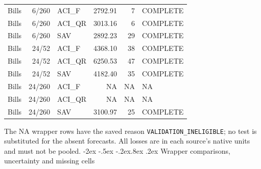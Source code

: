 \documentclass[10pt,a4paper]{article}
\makeatletter
\renewcommand\section{\@startsection{section}{1}{\z@}%
  {-2ex \@plus -.5ex \@minus -.2ex}{.8ex \@plus .2ex}%
  {\normalfont\large\bfseries}}
\makeatother
\begin{document}
\begin{longtable}{lrlrrl}
Bills & 6/260 & ACI\_F & 2792.91 & 7 & COMPLETE \\
Bills & 6/260 & ACI\_QR & 3013.16 & 6 & COMPLETE \\
Bills & 6/260 & SAV & 2892.23 & 29 & COMPLETE \\
Bills & 24/52 & ACI\_F & 4368.10 & 38 & COMPLETE \\
Bills & 24/52 & ACI\_QR & 6250.53 & 47 & COMPLETE \\
Bills & 24/52 & SAV & 4182.40 & 35 & COMPLETE \\
Bills & 24/260 & ACI\_F & NA & NA & NA \\
Bills & 24/260 & ACI\_QR & NA & NA & NA \\
Bills & 24/260 & SAV & 3100.97 & 25 & COMPLETE \\
\end{longtable}
\endgroup

The NA wrapper rows have the saved reason
\texttt{VALIDATION\_INELIGIBLE}; no test is substituted for the absent forecasts.
All losses are in each source's native units and must not be pooled.\section{Wrapper comparisons, uncertainty and missing cells}\label{sup:wp2-pairs}
\end{document}
